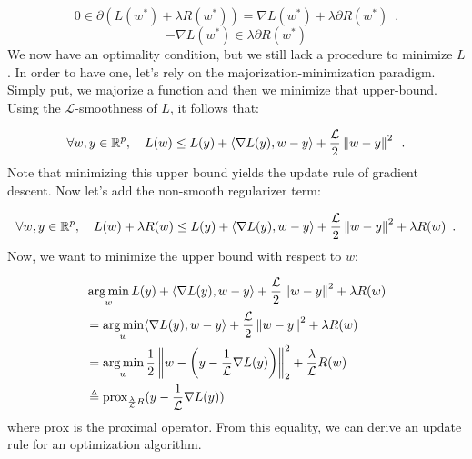 \documentclass[a4paper,10pt]{article}
\theoremstyle{definition}
\begin{document}
\begin{equation*}
    0 \in \partial
    \left(
    L(w^*) + \lambda R(w^*)
    \right)
    = \nabla L(w^*) + \lambda \partial R(w^*)
    \enspace .
\end{equation*}
%
\begin{equation*}
    - \nabla L(w^*) \in \lambda \partial R(w^*)
\end{equation*}
%
We now have an optimality condition, but we still lack a procedure to minimize $L$.
In order to have one, let's rely on the majorization-minimization paradigm. Simply put,
we majorize a function and then we minimize that upper-bound. Using the $\mathcal{L}$-smoothness
of $L$, it follows that:

\begin{equation*}
    \forall w, y \in \mathbb{R}^p,
    \quad
    L(w) \leq L(y) +
    \langle
    \nabla L(y),
    w-y
    \rangle +
    \frac{\mathcal{L}}{2}
    \left \lVert w - y \right \rVert^2
    \enspace .
\end{equation*}
%
Note that minimizing this upper bound yields the update rule of gradient descent. Now let's add
the non-smooth regularizer term:

\begin{equation*}
    \forall w, y \in \mathbb{R}^p,
    \quad
    L(w) + \lambda R(w) \leq L(y) +
    \langle
    \nabla L(y),
    w-y
    \rangle +
    \frac{\mathcal{L}}{2}
    \left \lVert w - y \right \rVert^2
    + \lambda R(w)
    \enspace .
\end{equation*}
%
Now, we want to minimize the upper bound with respect to $w$:

\begin{align*}
     & \operatorname*{arg\,min}_{w} L(y) +
    \langle
    \nabla L(y),
    w-y
    \rangle +
    \frac{\mathcal{L}}{2}
    \left \lVert w - y \right \rVert^2
    + \lambda R(w)                                           \\
     & = \operatorname*{arg\,min}_{w}
    \langle
    \nabla L(y),
    w-y
    \rangle +
    \frac{\mathcal{L}}{2}
    \left \lVert w - y \right \rVert^2
    + \lambda R(w)                                           \\
     & = \operatorname*{arg\,min}_{w}
    \frac{1}{2}
    \left \lVert 
        w - \left(
        y - \frac{1}{\mathcal{L}}\nabla L(y)
        \right)
     \right \rVert^2_2
    + \frac{\lambda}{\mathcal{L}}R(w)                        \\
     & \triangleq \text{prox}_{\frac{\lambda}{\mathcal{L}}R}
    (y - \frac{1}{\mathcal{L}}\nabla L(y))
\end{align*}
%
where $\text{prox}$ is the proximal operator. From this equality, we can derive an update
rule for an optimization algorithm.
\end{document}
